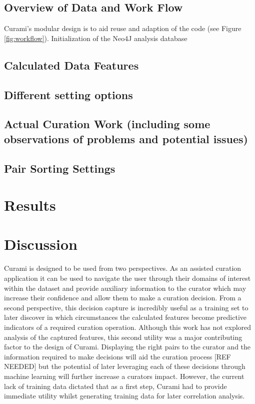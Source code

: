 \documentclass{bmcart}
\begin{document}
\subsection*{Overview of Data and Work Flow}

Curami's modular design is to aid reuse and adaption of the code (see Figure \ref{fig:workflow}). Initialization of the Neo4J analysis database

\subsection*{Calculated Data Features}

\subsection*{Different setting options}

\subsection*{Actual Curation Work (including some observations of problems and potential issues)}
\subsection*{Pair Sorting Settings} \label{pair_sorting_settings}

\section*{Results}

\section*{Discussion}

Curami is designed to be used from two perspectives. As an assisted curation application it can be used to navigate the user through their domains of interest within the dataset and provide auxiliary information to the curator which may increase their confidence and allow them to make a curation decision. From a second perspective, this decision capture is incredibly useful as a training set to later discover in which circumstances the calculated features become predictive indicators of a required curation operation. Although this work has not explored analysis of the captured features, this second utility was a major contributing factor to the design of Curami. Displaying the right pairs to the curator and the information required to make decisions will aid the curation process [REF NEEDED] but the potential of later leveraging each of these decisions through machine learning will further increase a curators impact. However, the current lack of training data dictated that as a first step, Curami had to provide immediate utility whilst generating training data for later correlation analysis.
\end{document}
